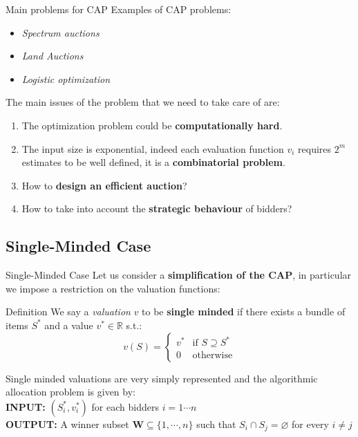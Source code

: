 \documentclass[aspectratio=169,xcolor=dvipsnames]{beamer}
\begin{document}
    \begin{frame}{Main problems for CAP}
    Examples of CAP problems:
    \begin{itemize}
        \item \textit{Spectrum auctions}
        \item \textit{Land Auctions}
        \item \textit{Logistic optimization}
    \end{itemize}
\pause
    \vspace{8pt}
    The main issues of the problem that we need to take care of are:
    \begin{enumerate}
        \item The optimization problem could be \textbf{computationally hard}.
        \item The input size is exponential, indeed each evaluation function $v_i$ requires $2^m$ estimates to be well defined, it is a \textbf{combinatorial problem}.
\pause
        \item How to \textbf{design an efficient auction}?
        \item How to take into account the \textbf{strategic behaviour} of bidders?
    \end{enumerate}
    \end{frame}
    
    \subsection{Single-Minded Case}
    \begin{frame}{Single-Minded Case}
    Let us consider a \textbf{simplification of the CAP}, in particular we impose a restriction on the valuation functions:
    \begin{block}{Definition}
    We say a \textit{valuation} $v$ to be \textbf{single minded} if there exists a bundle of items $S^*$ and a value $v^* \in \mathbb{R}$ s.t.:
    $$
        v(S)= 
    \begin{cases}
        v^* & \text{if } S\supseteq S^* \\
        0              & \text{otherwise}
    \end{cases}
    $$
    \end{block}
    \vspace{8pt}
\pause
    Single minded valuations are very simply represented and the algorithmic allocation problem is given by:\\ \vspace{3pt}
    \textbf{INPUT: } $(S^*_i, v^*_i)$ for each bidders $ i = 1 \cdots n$ \\
    \textbf{OUTPUT: } A winner subset $\boldsymbol{W} \subseteq \{1, \cdots ,n\}$ such that $S_i \cap S_j = \varnothing$ for every  $i \neq j$
    \end{frame}
    
\end{document}
